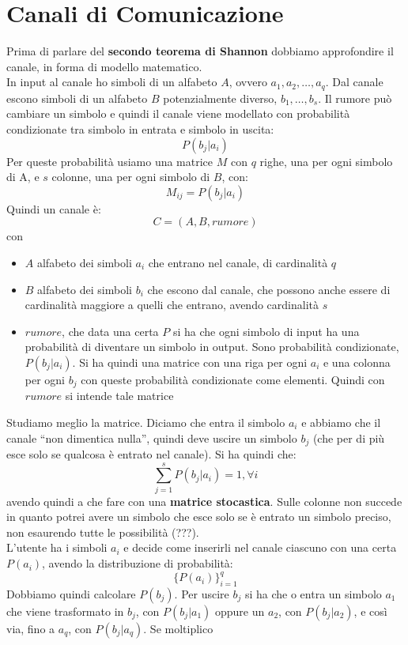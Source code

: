 \documentclass[a4paper,12pt, oneside]{book}
\begin{document}
\section{Canali di Comunicazione}
Prima di parlare del \textbf{secondo teorema di Shannon} dobbiamo approfondire
il canale, in forma di modello matematico. \\
In input al canale ho simboli di un alfabeto $A$, ovvero
$a_1,a_2,\ldots,a_q$. Dal canale escono simboli di un alfabeto $B$
potenzialmente diverso, $b_1,\ldots, b_s$. Il rumore può cambiare un simbolo e
quindi il canale viene modellato con probabilità condizionate tra simbolo in
entrata e simbolo in uscita:
\[P(b_j|a_i)\]
Per queste probabilità usiamo una matrice $M$ con $q$ righe, una per ogni
simbolo di A, e $s$ colonne, una per ogni simbolo di $B$, con:
\[M_{ij}=P(b_j|a_i)\]
Quindi un canale è:
\[C=(A,B,rumore)\]
con
\begin{itemize}
  \item $A$ alfabeto dei simboli $a_i$ che entrano nel canale, di cardinalità
  $q$ 
  \item $B$ alfabeto dei simboli $b_i$ che escono dal canale, che possono anche
  essere di cardinalità maggiore a quelli che entrano, avendo cardinalità $s$
  \item $rumore$, che data una certa $P$ si ha che ogni simbolo di input ha
  una probabilità di diventare un simbolo in output. Sono probabilità
  condizionate, $P(b_j|a_i)$. Si ha quindi una matrice con una riga per ogni
  $a_i$ e una colonna per ogni $b_j$ con queste probabilità condizionate come
  elementi. Quindi con $rumore$ si intende tale matrice
\end{itemize}
Studiamo meglio la matrice. Diciamo che entra il simbolo $a_i$ e abbiamo che il
canale ``non dimentica nulla'', quindi deve uscire un simbolo $b_j$ (che per di
più esce solo se qualcosa è entrato nel canale). Si ha quindi che:
\[\sum_{j=1}^s P(b_j|a_i)=1,\forall i\]
avendo quindi a che fare con una \textbf{matrice stocastica}. Sulle colonne non
succede in quanto potrei avere un simbolo che esce solo se è entrato un simbolo
preciso, non esaurendo tutte le possibilità (???).\\
L'utente ha i simboli $a_i$ e decide come inserirli nel canale ciascuno con una
certa $P(a_i)$, avendo la distribuzione di probabilità:
\[\{P(a_i)\}_{i=1}^q\]
Dobbiamo quindi calcolare $P(b_j)$. Per uscire $b_j$ si ha che o entra un
simbolo $a_1$ che viene trasformato in $b_j$, con $P(b_j|a_1)$ oppure un $a_2$,
con $P(b_j| a_2)$, e così via, fino a $a_q$, con $P(b_j| a_q)$. Se moltiplico
\end{document}
